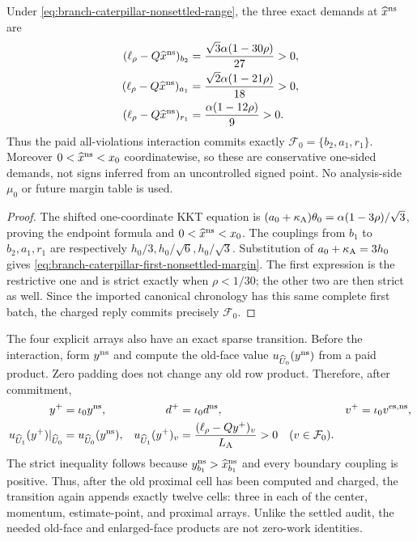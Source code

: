\begin{lemma}
\label{lem:branch-caterpillar-first-nonsettled-admission}
Under \cref{eq:branch-caterpillar-nonsettled-range}, the three exact demands
at $\widehat x^{\rm ns}$ are
\begin{align}
 (\ell_\rho-Q\widehat x^{\rm ns})_{b_2}
 &=\frac{\sqrt3\alpha(1-30\rho)}{27}>0,
 \notag\\
 (\ell_\rho-Q\widehat x^{\rm ns})_{a_1}
 &=\frac{\sqrt2\alpha(1-21\rho)}{18}>0,
 \notag\\
 (\ell_\rho-Q\widehat x^{\rm ns})_{r_1}
 &=\frac{\alpha(1-12\rho)}9>0.
 \label{eq:branch-caterpillar-first-nonsettled-margin}
\end{align}
Thus the paid all-violations interaction commits exactly
$\mathcal F_0=\{b_2,a_1,r_1\}$.  Moreover
$0<\widehat x^{\rm ns}<x_0$ coordinatewise, so these are conservative
one-sided demands, not signs inferred from an uncontrolled signed point.
No analysis-side $\mu_0$ or future margin table is used.
\end{lemma}

\begin{proof}
The shifted one-coordinate KKT equation is
$(a_0+\kappa_{\rm A})\theta_0
 =\alpha(1-3\rho)/\sqrt3$, proving the endpoint formula and
$0<\widehat x^{\rm ns}<x_0$.  The couplings from $b_1$ to
$b_2,a_1,r_1$ are respectively $h_0/3,h_0/\sqrt6,h_0/\sqrt3$.
Substitution of $a_0+\kappa_{\rm A}=3h_0$ gives
\cref{eq:branch-caterpillar-first-nonsettled-margin}.  The first expression
is the restrictive one and is strict exactly when $\rho<1/30$; the other two
are then strict as well.  Since the imported canonical chronology has this
same complete first batch, the charged reply commits precisely $\mathcal F_0$.
\end{proof}

The four explicit arrays also have an exact sparse transition.  Before the
interaction, form $y^{\rm ns}$ and compute the old-face value
$u_{\widehat U_0}(y^{\rm ns})$ from a paid product.  Zero padding does not
change any old row product.  Therefore, after commitment,
\begin{equation}
 \begin{aligned}
 y^+&=\iota_0y^{\rm ns},
 &d^+&=\iota_0d^{\rm ns},
 &v^+&=\iota_0v^{{\rm es},{\rm ns}},\\
 u_{\widehat U_1}(y^+)|_{\widehat U_0}
 &=u_{\widehat U_0}(y^{\rm ns}),
 &u_{\widehat U_1}(y^+)_v
 &=\frac{(\ell_\rho-Qy^+)_v}{L_{\rm A}}>0
 \quad(v\in\mathcal F_0).
 \end{aligned}
 \label{eq:branch-caterpillar-nonsettled-auxiliary-append}
\end{equation}
The strict inequality follows because $y^{\rm ns}_{b_1}>
\widehat x^{\rm ns}_{b_1}$ and every boundary coupling is positive.  Thus,
after the old proximal cell has been computed and charged, the transition
again appends exactly twelve cells: three in each of the center, momentum,
estimate-point, and proximal arrays.  Unlike the settled audit, the needed
old-face and enlarged-face products are not zero-work identities.

